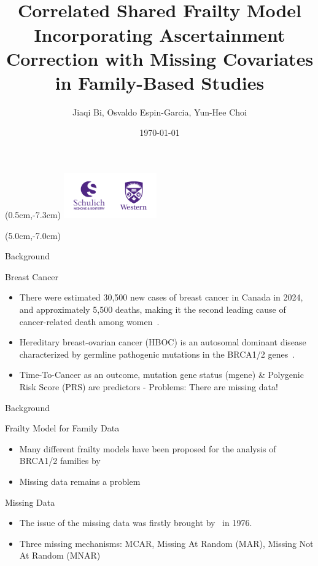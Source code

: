 \documentclass [aspectratio=169]{beamer}
\title[]{\vspace{60pt} \\
Correlated Shared Frailty Model
Incorporating Ascertainment Correction with Missing Covariates
in Family-Based Studies}
\author[]{Jiaqi Bi, Osvaldo Espin-Garcia, Yun-Hee Choi}
\institute[]{Department of Epidemiology and Biostatistics\\
             Schulich School of Medicine \& Dentistry\\
             University of Western Ontario}
\date{\today}
\begin{document}
{
\begin{frame}
    \titlepage
    \begin{textblock*}{4cm}(0.5cm,-7.3cm)
        \includegraphics[width=4cm]{schulichuwo.png}
    \end{textblock*}
    \begin{textblock*}{8cm}(5.0cm,-7.0cm)
        \huge {}
    \end{textblock*}
\end{frame}
}

\begin{frame}{Background}
    \begin{block}{Breast Cancer}
        \begin{itemize}
            \item There were estimated 30,500 new cases of breast cancer in Canada in 2024, and approximately 5,500 deaths, making it the second leading cause of cancer-related death among women~\cite{BCCanadaStatistics2023}.
            \item Hereditary breast-ovarian cancer (HBOC) is an autosomal dominant disease characterized by germline pathogenic mutations in the BRCA1/2 genes~\cite{pritchard2019new}.
            \item Time-To-Cancer as an outcome, mutation gene status (mgene) \& Polygenic Risk Score (PRS) are predictors - Problems: There are missing data!
        \end{itemize}
    \end{block}
\end{frame}

\begin{frame}{Background}
    \begin{block}{Frailty Model for Family Data}
        \begin{itemize}
            \item Many different frailty models have been proposed for the analysis of BRCA1/2 families by~\citet{choi2021competing, chen2009frailty}
            \item Missing data remains a problem
        \end{itemize}
    \end{block}
    \begin{block}{Missing Data}
        \begin{itemize}
            \item The issue of the missing data was firstly brought by~\citet{rubin1976inference} in 1976.
            \item Three missing mechanisms: MCAR, Missing At Random (MAR), Missing Not At Random (MNAR)
        \end{itemize}
    \end{block}
\end{frame}
\end{document}
